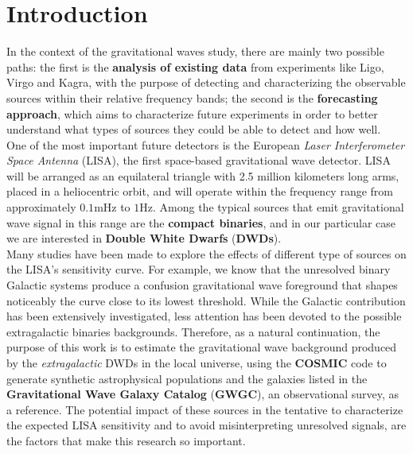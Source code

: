 \chapter*{Introduction}
In the context of the gravitational waves study, there are mainly two possible paths: the first is the \textbf{analysis of existing data} from experiments like Ligo, Virgo and Kagra, with the purpose of detecting and characterizing the observable sources within their relative frequency bands;
the second is the \textbf{forecasting approach}, which aims to characterize future experiments in order to better understand what types of sources they could be able to detect and how well.
\vspace{2mm}\\
One of the most important future detectors is the European \textit{Laser Interferometer Space Antenna} (LISA), the first space-based gravitational wave detector. 
LISA will be arranged as an equilateral triangle with 2.5 million kilometers long arms, placed in a heliocentric orbit, and will operate within the frequency range from approximately $0.1\mathrm{mHz}$ to $1\mathrm{Hz}$. 
Among the typical sources that emit gravitational wave signal in this range are the \textbf{compact binaries}, and in our particular case we are interested in \textbf{Double White Dwarfs} (\textbf{DWDs}).
\vspace{2mm}\\
Many studies have been made to explore the effects of different type of sources on the LISA's sensitivity curve.
For example, we know that the unresolved binary Galactic systems produce a confusion gravitational wave foreground that shapes noticeably the curve close to its lowest threshold.
While the Galactic contribution has been extensively investigated, less attention has been devoted to the possible extragalactic binaries backgrounds.
Therefore, as a natural continuation, the purpose of this work is to estimate the gravitational wave background produced by the \textit{extragalactic} DWDs in the local universe, using the \textbf{COSMIC} code to generate synthetic astrophysical populations and the galaxies listed in the \textbf{Gravitational Wave Galaxy Catalog} (\textbf{GWGC}), an observational survey, as a reference.
The potential impact of these sources in the tentative to characterize the expected LISA sensitivity and to avoid misinterpreting unresolved signals, are the factors that make this research so important.
\vspace{2mm}
\\  
